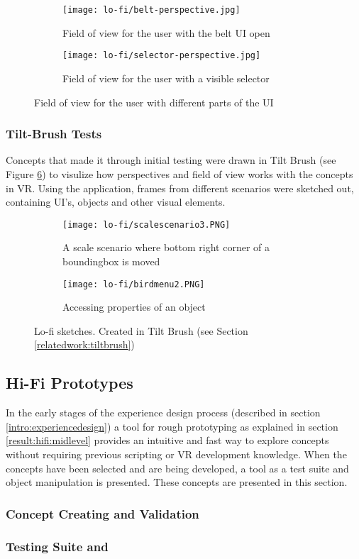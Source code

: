 
\begin{figure}
  \begin{subfigure}{.5\textwidth}
  \centering
  \texttt{[image: lo-fi/belt-perspective.jpg]}
  \caption{Field of view for the user with the belt UI open}
  \label{fig:lofi:fov:belt-ui}
  \end{subfigure}%
  \begin{subfigure}{.5\textwidth}
    \centering
    \texttt{[image: lo-fi/selector-perspective.jpg]}
    \caption{Field of view for the user with a visible selector}
    \label{fig:lofi:fov:selector}
\end{subfigure}
\caption{Field of view for the user with different parts of the UI}
\label{fig:lofi:fov}
\end{figure}


\subsubsection{Tilt-Brush Tests}
Concepts that made it through initial testing were drawn in Tilt Brush (see Figure \ref{fig:lofi:tilt})  to visulize how perspectives and field of view works with the concepts in VR. Using the application, frames from different scenarios were sketched out, containing UI's, objects and other visual elements.


\begin{figure}
\begin{subfigure}{.5\textwidth}
  \centering
  \texttt{[image: lo-fi/scalescenario3.PNG]}
  \caption{A scale scenario where bottom right corner of a boundingbox is moved}
  \label{fig:lofi:tilt:scale3}
\end{subfigure}%
\begin{subfigure}{.5\textwidth}
  \centering
  \texttt{[image: lo-fi/birdmenu2.PNG]}
  \caption{Accessing properties of an object}
  \label{fig:lofi:tilt:passivemenu}
\end{subfigure}
\caption{Lo-fi sketches. Created in Tilt Brush (see Section \ref{relatedwork:tiltbrush})}
\label{fig:lofi:tilt}
\end{figure}

\subsection{Hi-Fi Prototypes}
In the early stages of the experience design process (described in section \ref{intro:experiencedesign}) a tool for rough prototyping as explained in section \ref{result:hifi:midlevel} provides an intuitive and fast way to explore concepts without requiring previous scripting or VR development knowledge. When the concepts have been selected and are being developed, a tool as a test suite and object manipulation is presented. These concepts are presented in this section.
\subsubsection{Concept Creating and Validation}
\subsubsection{Testing Suite and }
